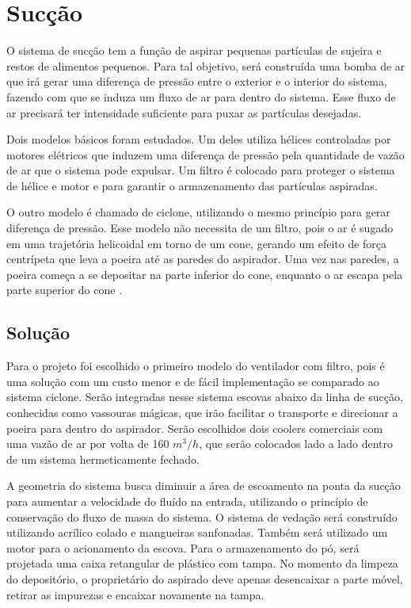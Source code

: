 \section{Sucção} %
\label{sub:aspirador}
	
	O sistema de sucção tem a função de aspirar pequenas partículas de sujeira e restos de alimentos pequenos. Para tal objetivo, será construída uma bomba de ar que irá gerar uma diferença de pressão entre o exterior e o interior do sistema, fazendo com que se induza um fluxo de ar para dentro do sistema. Esse fluxo de ar precisará ter intensidade suficiente para puxar as partículas desejadas. 

	Dois modelos básicos foram estudados. Um deles utiliza hélices controladas por motores elétricos que induzem uma diferença de pressão pela quantidade de vazão de ar que o sistema pode expulsar.  Um filtro é colocado para proteger o sistema de hélice e motor e para garantir o armazenamento das partículas aspiradas.

	O outro modelo é chamado de ciclone, utilizando o mesmo princípio para gerar diferença de pressão. Esse modelo não necessita de um filtro, pois o ar é sugado em uma trajetória helicoidal em torno de um cone, gerando um efeito de força centrípeta que leva a poeira até as paredes do aspirador. Uma vez nas paredes, a poeira começa a se depositar na parte inferior do cone, enquanto o ar escapa pela parte superior do cone \cite{layton}.

	\subsection{Solução} %
	\label{sub:solução}
		
		Para o projeto foi escolhido o primeiro modelo do ventilador com filtro, pois é uma solução com um custo menor e de fácil implementação se comparado ao sistema ciclone. Serão integradas nesse sistema escovas abaixo da linha de sucção, conhecidas como vassouras mágicas, que irão facilitar o transporte e direcionar a poeira para dentro do aspirador. Serão escolhidos dois coolers comerciais com uma vazão de ar por volta de 160 $m^3/h$, que serão colocados lado a lado dentro de um sistema hermeticamente fechado. 

		A geometria do sistema busca diminuir a área de escoamento na ponta da sucção para aumentar a velocidade do fluído na entrada, utilizando o princípio de conservação do fluxo de massa do sistema. O sistema de vedação será construído utilizando acrílico colado e mangueiras sanfonadas. Também será utilizado um motor para o acionamento da escova. Para o armazenamento do pó, será projetada uma caixa retangular de plástico com tampa. No momento da limpeza do depositório, o proprietário do aspirado deve apenas desencaixar a parte móvel, retirar as impurezas e encaixar novamente na tampa.

